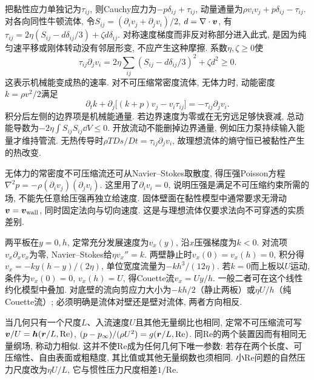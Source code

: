 把黏性应力单独记为$\tau_{ij}$, 则Cauchy应力为$-p\delta_{ij}+\tau_{ij}$, 动量通量为$\rho v_iv_j+p\delta_{ij}-\tau_{ij}$. 对各向同性牛顿流体, 令$S_{ij}=(\partial_iv_j+\partial_jv_i)/2$, $d=\nabla\cdot\boldsymbol{v}$, 有$\tau_{ij}=2\eta(S_{ij}-d\delta_{ij}/3)+\zeta d\delta_{ij}$. 对称速度梯度而非反对称部分进入此式, 是因为纯匀速平移或刚体转动没有邻层形变, 不应产生这种摩擦. 系数$\eta,\zeta\ge0$使
\[
\tau_{ij}\partial_jv_i
=2\eta\sum_{ij}(S_{ij}-d\delta_{ij}/3)^2+\zeta d^2\ge0.
\]
这表示机械能变成热的速率. 对不可压缩常密度流体, 无体力时, 动能密度$k=\rho v^2/2$满足
\[
\partial_tk+\partial_j\bigl[(k+p)v_j-v_i\tau_{ij}\bigr]
=-\tau_{ij}\partial_jv_i.
\]
积分后左侧的边界项是机械能通量. 若边界速度为零或在无穷远足够快衰减, 总动能导数为$-2\eta\int S_{ij}S_{ij}\dd V\le0$. 开放流动不能删掉边界通量, 例如压力泵持续输入能量才维持管流. 无热传导时$\rho T Ds/Dt=\tau_{ij}\partial_jv_i$, 故理想流体的熵守恒已被黏性产生的热改变.

无体力的常密度不可压缩流还可从Navier--Stokes取散度, 得压强Poisson方程$\nabla^2p=-\rho(\partial_iv_j)(\partial_jv_i)$. 这里用了$\partial_iv_i=0$, 说明压强是满足不可压缩约束所需的场, 不能先任意给压强再独立给速度. 固体壁面在黏性模型中通常要求无滑动$\boldsymbol{v}=\boldsymbol{v}_{\mathrm{wall}}$, 同时固定法向与切向速度. 这是与理想流体仅要求法向不可穿透的实质差别.

两平板在$y=0,h$, 定常充分发展速度为$v_x(y)$, 沿$x$压强梯度为$k<0$. 对流项$v_x\partial_xv_x$为零, Navier--Stokes给$\eta v_x''=k$. 两壁静止时$v_x(0)=v_x(h)=0$, 积分得$v_x=-ky(h-y)/(2\eta)$, 单位宽度流量为$-kh^3/(12\eta)$. 若$k=0$而上板以$U$运动, 条件为$v_x(0)=0$, $v_x(h)=U$, 得Couette流$v_x=Uy/h$. 一般二者可在这个线性约化模型中叠加. 对底壁的流向剪应力大小为$-kh/2$（静止两板）或$\eta U/h$（纯Couette流）; 必须明确是流体对壁还是壁对流体, 两者方向相反.

当几何只有一个尺度$L$、入流速度$U$且其他无量纲比也相同, 定常不可压缩流可写$\boldsymbol{v}/U=\boldsymbol{h}(\boldsymbol{r}/L,\mathrm{Re})$, $(p-p_\infty)/(\rho U^2)=g(\boldsymbol{r}/L,\mathrm{Re})$. 同Re的两个装置因而有相同无量纲场, 称动力相似. 这并不使Re成为任何几何下唯一参数: 若存在两个长度、可压缩性、自由表面或粗糙度, 其比值或其他无量纲数也须相同. 小Re问题的自然压力尺度改为$\eta U/L$, 它与惯性压力尺度相差$1/\mathrm{Re}$.

